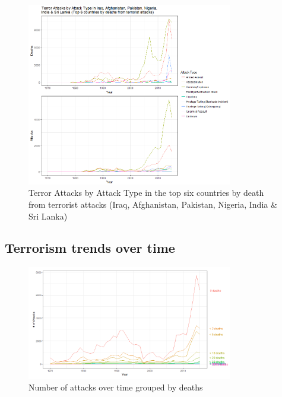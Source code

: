 \documentclass[10pt,a4paper]{article}
\begin{document}
\begin{center}
\begin{figure}[H]
		
	\includegraphics[width=0.8\textwidth]{Plots/AttackType/Top6.png}
	\caption{Terror Attacks by Attack Type in the top six countries by death from terrorist attacks (Iraq, Afghanistan, Pakistan, Nigeria, India \& Sri Lanka)}
	
\end{figure}
\end{center}

\subsection{Terrorism trends over time}
\begin{center}
\begin{figure}[H]
		
	\includegraphics[width=0.8\textwidth]{Plots/OverTime/Attacks_over_time_grouped_by_deaths.png}
	\caption{Number of attacks over time grouped by deaths}

\end{figure}
\end{center}
\end{document}
